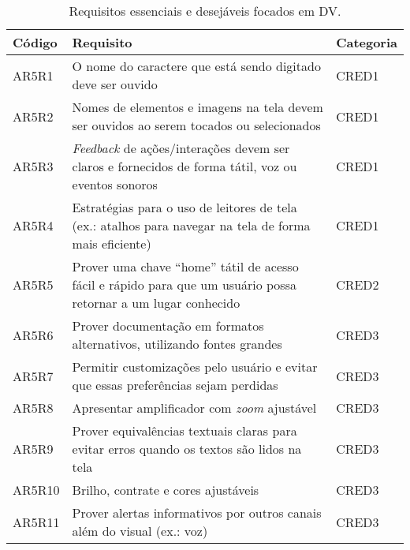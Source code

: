 \begin{table}[htb]
  \begin{center}
    \ABNTEXfontereduzida
    \caption{Requisitos essenciais e desejáveis focados em DV.}
    \label{tab-req-ess-des-1}
    \begin{tabular}{p{1.2cm}|p{12.1cm}|p{1.4cm}}
      \textbf{Código} & \textbf{Requisito}                                                                                               & \textbf{Categoria} \\
      \hline
      AR5R1           & O nome do caractere que está sendo digitado deve ser ouvido                                                      & CRED1              \\
      \hline
      AR5R2           & Nomes de elementos e imagens na tela devem ser ouvidos ao serem tocados ou selecionados                          & CRED1              \\
      \hline
      AR5R3           & \emph{Feedback} de ações/interações devem ser claros e fornecidos de forma tátil, voz ou eventos sonoros         & CRED1              \\
      \hline
      AR5R4           & Estratégias para o uso de leitores de tela (ex.\@: atalhos para navegar na tela de forma mais eficiente)         & CRED1              \\
      \hline
      AR5R5           & Prover uma chave ``home'' tátil de acesso fácil e rápido para que um usuário possa retornar a um lugar conhecido & CRED2              \\
      \hline
      AR5R6           & Prover documentação em formatos alternativos, utilizando fontes grandes                                          & CRED3              \\
      \hline
      AR5R7           & Permitir customizações pelo usuário e evitar que essas preferências sejam perdidas                               & CRED3              \\
      \hline
      AR5R8           & Apresentar amplificador com \emph{zoom} ajustável                                                                & CRED3              \\
      \hline
      AR5R9           & Prover equivalências textuais claras para evitar erros quando os textos são lidos na tela                        & CRED3              \\
      \hline
      AR5R10          & Brilho, contrate e cores ajustáveis                                                                              & CRED3              \\
      \hline
      AR5R11          & Prover alertas informativos por outros canais além do visual (ex.\@: voz)                                        & CRED3              \\
    \end{tabular}
  \end{center}
\end{table}

